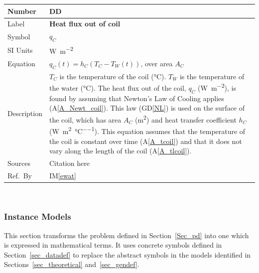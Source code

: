 \documentclass[12pt]{article}
\newcommand{\colAwidth}{0.13\textwidth}
\newcommand{\colBwidth}{0.82\textwidth}
\newcounter{defnum} %
\newcommand{\dref}[1]{GD\ref{#1}}
\newcounter{datadefnum} %
\newcommand{\aref}[1]{A\ref{#1}}
\newcommand{\iref}[1]{IM\ref{#1}}
\begin{document}
\noindent
\begin{minipage}{\textwidth}
	\renewcommand*{\arraystretch}{1.5}
	\begin{tabular}{| p{\colAwidth} | p{\colBwidth}|}
		\hline
		\rowcolor[gray]{0.9}
		Number& DD{datadefnum}\thedatadefnum \label{FluxCoil}\\
		\hline
		Label& \bf Heat flux out of coil\\
		\hline
		Symbol &$q_C$\\
		\hline
		SI Units & \si{\watt\per\square\metre}\\
		\hline
		Equation&$q_C(t) = h_C (T_C - T_W(t))$, over area $A_C$\\
		\hline
		Description & 
		$T_C$ is the temperature of the coil (\si{\celsius}).  $T_W$ is the temperature of the water (\si{\celsius}).  
		The heat flux out of the coil, $q_C$ (\si{\watt\per\square\metre}), is found by
		assuming that Newton's Law 
		of Cooling applies (\aref{A_Newt_coil}).  This law (\dref{NL}) is used on the surface of
		the coil, which has area $A_C$ (\si{\square\metre}) and heat 
		transfer coefficient $h_C$
		(\si{\watt\per\square\metre\per\celsius}).  This equation
		assumes that the temperature of the coil is constant over time (\aref{A_tcoil}) and that it does not vary along the length
		of the coil (\aref{A_tlcoil}).
		\\
		\hline
		Sources& Citation here \\
		\hline
		Ref.\ By & \iref{ewat}\\
		\hline
	\end{tabular}
\end{minipage}\\





\subsubsection{Instance Models} \label{sec_instance}    

This section transforms the problem defined in Section~\ref{Sec_pd} into 
one which is expressed in mathematical terms. It uses concrete symbols defined 
in Section~\ref{sec_datadef} to replace the abstract symbols in the models 
identified in Sections~\ref{sec_theoretical} and~\ref{sec_gendef}.
\end{document}
